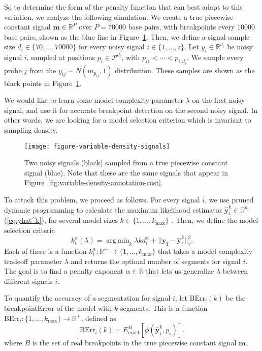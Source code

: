 \documentclass{article}
\DeclareMathOperator*{\argmin}{arg\,min}
\newcommand{\RR}{\mathbb{R}}
\begin{document}
So to determine the form of the penalty function that can best adapt
to this variation, we analyze the following simulation. We create a
true piecewise constant signal $\mathbf m\in\RR^P$ over $P=70000$ base
pairs, with breakpoints every 10000 base pairs, shown as the blue line
in Figure~\ref{fig:variable-density-signals}. Then, we define a signal
sample size $d_i\in\{70,\dots,70000\}$ for every noisy signal
$i\in\{1,\dots,z\}$. Let $y_i\in\RR^{d_i}$ be noisy signal $i$,
sampled at positions $p_i\in\mathcal P^{d_i}$, with
$p_{i1}<\cdots<p_{i,d_i}$. We sample every probe $j$ from the
$y_{ij}\sim N(m_{p_{ij}},1)$ distribution. These samples are shown as
the black points in Figure~\ref{fig:variable-density-signals}.

We would like to learn some model complexity parameter $\lambda$ on
the first noisy signal, and use it for accurate breakpoint detection
on the second noisy signal. In other words, we are looking for a model
selection criterion which is invariant to sampling density. 

\begin{figure}[H]
\texttt{[image: figure-variable-density-signals]}
%
\vskip -0.3cm
  \caption{Two noisy signals (black) sampled from
  a true piecewise constant signal (blue). 
Note that these are the same signals that appear in
  Figure~\ref{fig:variable-density-annotation-cost}.}
\label{fig:variable-density-signals}
\end{figure}

\newpage


To attack this problem, we proceed as follows. For every signal $i$,
we use pruned dynamic programming to calculate the maximum likelihood
estimator $\mathbf{\hat y}^k_i\in\RR^{d_i}$ (\ref{eq:yhat^k}), for several model sizes
$k\in\{1,\dots,k_{\text{max}}\}$ \citep{pruned-dp}. Then, we define
the model selection criteria
\begin{equation}
  \label{eq:kstar_density}
  k^\alpha_i(\lambda) =\argmin_k \lambda k d_i^\alpha + 
  ||\mathbf{y_i}-\mathbf{\hat y}^k_i||_2^2.
\end{equation}
Each of these is a function $k_i^\alpha:\RR^+\rightarrow
\{1,\dots,k_{\text{max}}\}$ that takes a model complexity tradeoff
parameter $\lambda$ and returns the optimal number of segments for
signal $i$. The goal is to find a penalty exponent $\alpha\in\RR$ that
lets us generalize $\lambda$ between different signals $i$.


To quantify the accuracy of a segmentation for signal $i$, let
$\text{BErr}_i(k)$ be the breakpointError of the model with
$k$ segments. This is a function
$\text{BErr}_i:\{1,\dots,k_{\text{max}}\}\rightarrow\RR^+$, defined as
\begin{equation}
  \label{eq:berr}
  \text{BErr}_i(k) = E_{\text{exact}}^{B}\left[
\phi(\mathbf{\hat y}_i^k,p_i)
\right].
\end{equation}
where $B$ is the set of real breakpoints in the true piecewise constant
signal $\mathbf m$.
\end{document}
